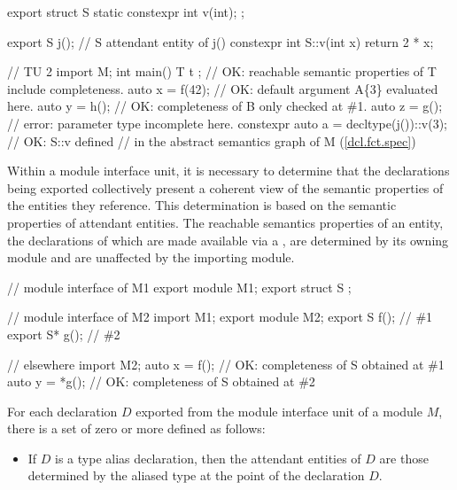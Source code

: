 \begin{std.txt}
\begin{example}
\begin{codeblock}
      export struct S {
        static constexpr int v(int);
      };

      export S j();       // S attendant entity of j()
      constexpr int S::v(int x) { return 2 * x; }


      // TU 2
      import M;
      int main() {
        T t { };             // OK: reachable semantic properties of T include completeness. 
        auto x = f(42);      // OK: default argument A\{3\} evaluated here.
        auto y = h();        // OK: completeness of B only checked at \#1.
        auto z = g();        // error: parameter type incomplete here.
        constexpr auto a = decltype(j())::v(3); // OK: S::v defined 
                            // in the abstract semantics graph of M (\ref{dcl.fct.spec})
      }
    \end{codeblock}
  \end{example}
  \exitnote

  \alinea
  Within a module interface unit, it is necessary to determine that the
  declarations being exported collectively present a coherent view of 
  the semantic properties of the entities they reference.  This determination
  is based on the semantic properties of attendant entities.
  \enternote
  The reachable semantics properties of an entity, the declarations of which
  are made available via a , are
  determined by its owning module and are unaffected by the importing module.
  \begin{example}
    \begin{codeblock}
      // module interface of M1
      export module M1;
      export struct S { };

      // module interface of M2
      import M1;
      export module M2;
      export S f();       // \#1
      export S* g();      // \#2

      // elsewhere
      import M2;
      auto x = f();       // OK: completeness of S obtained at \#1
      auto y = *g();      // OK: completeness of S obtained at \#2
    \end{codeblock}
  \end{example}
  \exitnote
  
  For each declaration $D$ exported from the module interface unit of a module $M$,
   there is a set of zero or more
   defined as follows:
  \begin{itemize}
    \item If $D$ is a type alias declaration, then the attendant entities
    of $D$ are those determined by the aliased type at the point of the 
    declaration $D$.


\end{itemize}
\end{std.txt}
